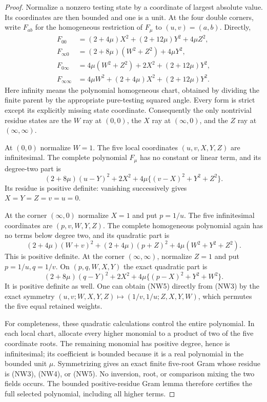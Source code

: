 \begin{proof}
Normalize a nonzero testing state by a coordinate of largest absolute
value. Its coordinates are then bounded and one is a unit. At the four
double corners, write $F_{ab}$ for the homogeneous restriction of
$F_\mu$ to $(u,v)=(a,b)$. Directly,
\[
\begin{aligned}
F_{00}&=(2+4\mu)X^2+(2+12\mu)Y^2+4\mu Z^2,\\
F_{\infty0}&=(2+8\mu)(W^2+Z^2)+4\mu Y^2,\\
F_{0\infty}&=4\mu(W^2+Z^2)+2X^2+(2+12\mu)Y^2,\\
F_{\infty\infty}&=4\mu W^2+(2+4\mu)X^2+(2+12\mu)Y^2.
\end{aligned}                                                    \tag{NW2}
\]
Here infinity means the polynomial homogeneous chart, obtained by
dividing the finite parent by the appropriate pure-testing squared
angle. Every form is strict except its explicitly missing state
coordinate. Consequently the only nontrivial residue states are the
$W$ ray at $(0,0)$, the $X$ ray at $(\infty,0)$,
and the $Z$ ray at $(\infty,\infty)$.

At $(0,0)$ normalize $W=1$. The five local coordinates
$(u,v,X,Y,Z)$ are infinitesimal. The complete polynomial $F_\mu$
has no constant or linear term, and its degree-two part is
\[
 (2+8\mu)(u-Y)^2+2X^2
       +4\mu\{(v-X)^2+Y^2+Z^2\}.                    \tag{NW3}
\]
Its residue is positive definite: vanishing successively gives
$X=Y=Z=v=u=0$.

At the corner $(\infty,0)$ normalize $X=1$ and put $p=1/u$.
The five infinitesimal coordinates are $(p,v,W,Y,Z)$. The complete
homogeneous polynomial again has no terms below degree two, and its
quadratic part is
\[
 (2+4\mu)(W+v)^2+(2+4\mu)(p+Z)^2
                         +4\mu(W^2+Y^2+Z^2).        \tag{NW4}
\]
This is positive definite. At the corner $(\infty,\infty)$,
normalize $Z=1$ and put $p=1/u,q=1/v$. On $(p,q,W,X,Y)$ the exact
quadratic part is
\[
 (2+8\mu)(q-Y)^2+2X^2
                         +4\mu\{(p-X)^2+Y^2+W^2\}. \tag{NW5}
\]
It is positive definite as well. One can obtain (NW5) directly from
(NW3) by the exact symmetry
$(u,v;W,X,Y,Z)\mapsto(1/v,1/u;Z,X,Y,W)$, which permutes the five
equal retained weights.

For completeness, these quadratic calculations control the entire
polynomial. In each local chart, allocate every higher monomial to a
product of two of the five coordinate roots. The remaining monomial
has positive degree, hence is infinitesimal; its coefficient is bounded
because it is a real polynomial in the bounded unit $\mu$. Symmetrizing
gives an exact finite five-root Gram whose residue is (NW3), (NW4), or
(NW5). No inversion, root, or comparison mixing the two fields occurs.
The bounded positive-residue Gram lemma therefore certifies the full
selected polynomial, including all higher terms.


\end{proof}
